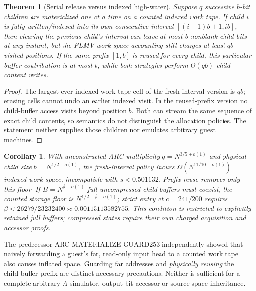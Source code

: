 \documentclass[10pt]{article}
\newtheorem{theorem}{Theorem}
\newtheorem{corollary}{Corollary}
\begin{document}
\begin{theorem}[Serial release versus indexed high-water]
Suppose $q$ successive $b$-bit children are materialized one at a time on a counted indexed work tape. If child $i$ is fully written/indexed into its own consecutive interval $[(i-1)b+1,ib]$, then clearing the previous child's interval can leave at most $b$ nonblank child bits at any instant, but the FLMV work-space accounting still charges at least $qb$ visited positions. If the same prefix $[1,b]$ is reused for every child, this particular buffer contribution is at most $b$, while both strategies perform $\Theta(qb)$ child-content writes.
\end{theorem}
\begin{proof}
The largest ever indexed work-tape cell of the fresh-interval version is $qb$; erasing cells cannot undo an earlier indexed visit. In the reused-prefix version no child-buffer access visits beyond position $b$. Both can stream the same sequence of exact child contents, so semantics do not distinguish the allocation policies. The statement neither supplies those children nor emulates arbitrary guest machines.
\end{proof}
\begin{corollary}
With unconstructed ARC multiplicity $q=N^{3/5+o(1)}$ and physical child size $b=N^{1/2+o(1)}$, the fresh-interval policy incurs $\Omega(N^{11/10-o(1)})$ indexed work space, incompatible with $s<0.501132$. Prefix reuse removes only this floor. If $B=N^{\beta+o(1)}$ full uncompressed child buffers must coexist, the counted storage floor is $N^{1/2+\beta-o(1)}$; strict entry at $c=241/200$ requires $\beta<26279/23232400\approx0.00113113582755$. This condition is restricted to explicitly retained full buffers; compressed states require their own charged acquisition and accessor proofs.
\end{corollary}
The predecessor ARC-MATERIALIZE-GUARD253 independently showed that naively forwarding a guest's far, read-only input head to a counted work tape also causes inflated space. Guarding far addresses and \emph{physically reusing} the child-buffer prefix are distinct necessary precautions. Neither is sufficient for a complete arbitrary-$A$ simulator, output-bit accessor or source-space inheritance.
\end{document}
